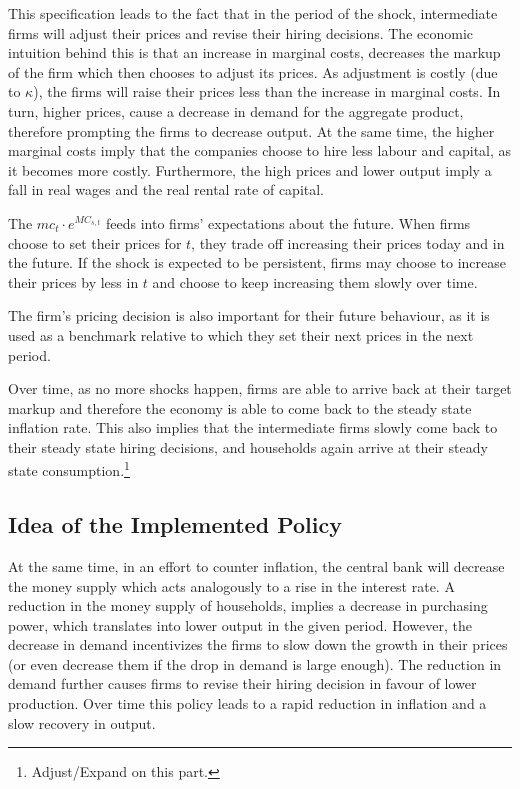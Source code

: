 \documentclass[12pt]{article}
\begin{document}
This specification leads to the fact that in the period of the shock, intermediate firms will adjust their prices and revise their hiring decisions. The economic intuition behind this is that an increase in marginal costs, decreases the markup of the firm which then chooses to adjust its prices. As adjustment is costly (due to $\kappa$), the firms will raise their prices less than the increase in marginal costs. In turn, higher prices, cause a decrease in demand for the aggregate product, therefore prompting the firms to decrease output. At the same time, the higher marginal costs imply that the companies choose to hire less labour and capital, as it becomes more costly. Furthermore, the high prices and lower output imply a fall in real wages and the real rental rate of capital.

The $mc_t \cdot e^{MC_{s, t}}$ feeds into firms' expectations about the future. When firms choose to set their prices for $t$, they trade off increasing their prices today and in the future. If the shock is expected to be persistent, firms may choose to increase their prices by less in $t$ and choose to keep increasing them slowly over time. 

The firm's pricing decision is also important for their future behaviour, as it is used as a benchmark relative to which they set their next prices in the next period. 

Over time, as no more shocks happen, firms are able to arrive back at their target markup and therefore the economy is able to come back to the steady state inflation rate. This also implies that the intermediate firms slowly come back to their steady state hiring decisions, and households again arrive at their steady state consumption.\footnote{Adjust/Expand on this part.}

\subsection*{Idea of the Implemented Policy}

At the same time, in an effort to counter inflation, the central bank will decrease the money supply which acts analogously to a rise in the interest rate. A reduction in the money supply of households, implies a decrease in purchasing power, which translates into lower output in the given period. However, the decrease in demand incentivizes the firms to slow down the growth in their prices (or even decrease them if the drop in demand is large enough). The reduction in demand further causes firms to revise their hiring decision in favour of lower production. Over time this policy leads to a rapid reduction in inflation and a slow recovery in output.
\end{document}
